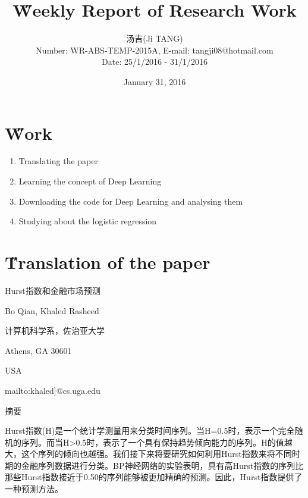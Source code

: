 \documentclass[12pt]{article}
\title{{\H Weekly Report of Research Work\\ }\quad {WR-ABS-TEMP-2015A-No.010}}
\author{汤吉(Ji TANG)\\
               Number: WR-ABS-TEMP-2015A,  E-mail: tangji08@hotmail.com \\
        Date: 25/1/2016 - 31/1/2016}
\date{January 31, 2016}
\begin{document}
  
\maketitle
\pagestyle{fancy}
\fancyhead[LO,RE]{\leftmark} %



\renewcommand{\headrulewidth}{0.4pt}
\renewcommand{\footrulewidth}{0.4pt}



\tableofcontents 
\newpage
\section{\H Work}
\begin{enumerate}
	\item Translating the paper
	\item Learning the concept of Deep Learning
	\item Downloading the code for Deep Learning and analysing them
	\item Studying about the logistic regression
\end{enumerate}

\section{\H Translation of the paper}
Hurst指数和金融市场预测

Bo Qian, Khaled Rasheed

计算机科学系，佐治亚大学

Athens, GA 30601

USA

mailto:khaled]@cs.uga.edu

摘要

Hurst指数(H)是一个统计学测量用来分类时间序列。当H=0.5时，表示一个完全随机的序列。而当H>0.5时，表示了一个具有保持趋势倾向能力的序列。H的值越大，这个序列的倾向也越强。我们接下来将要研究如何利用Hurst指数来将不同时期的金融序列数据进行分类。BP神经网络的实验表明，具有高Hurst指数的序列比那些Hurst指数接近于0.50的序列能够被更加精确的预测。因此，Hurst指数提供了一种预测方法。
\end{document}
